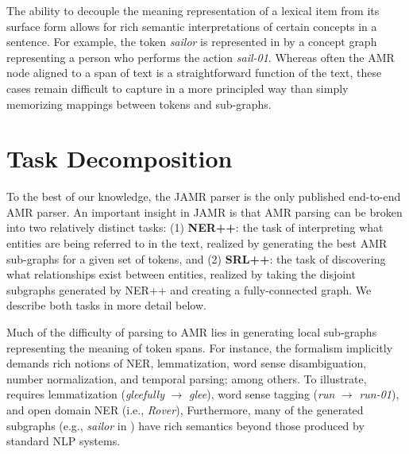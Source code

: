 \documentclass[11pt]{article}
\newcommand\w[1]{\textit{#1}} %
\newcommand\n[1]{\textit{#1}} %
\begin{document}
The ability to decouple the meaning representation of a lexical item from its
  surface form allows for rich semantic interpretations of certain concepts
  in a sentence.
For example, the token \w{sailor} is represented in  by a concept graph 
  representing a person who performs the action \n{sail-01}. 
Whereas often the AMR node aligned to a span of text is a straightforward function
  of the text, these cases remain difficult to capture in a more principled way than
  simply memorizing mappings between tokens and sub-graphs.


\section{Task Decomposition}



To the best of our knowledge, the JAMR parser is
the only published end-to-end AMR parser.
An important insight in JAMR is that AMR parsing can be broken into two 
relatively distinct tasks: (1) \textbf{NER++}: the task of interpreting what entities are being referred to in 
the text, realized by generating the best AMR sub-graphs for a given set of tokens, and
(2) \textbf{SRL++}: the task of discovering what 
relationships exist between entities, realized by taking the disjoint subgraphs generated
  by NER++ and creating a fully-connected graph.
We describe both tasks in more detail below.


Much of the difficulty of parsing to AMR lies in generating local sub-graphs representing the meaning of token spans.
For instance, the formalism implicitly demands rich notions of NER, lemmatization, word sense disambiguation, number normalization, and temporal parsing; among others.
To illustrate,  requires lemmatization (\textit{gleefully} $\rightarrow$ \textit{glee}), word sense tagging (\textit{run} $\rightarrow$ \textit{run-01}), and open domain NER (i.e., \textit{Rover}),
Furthermore, many of the generated subgraphs (e.g., \textit{sailor} in ) have rich semantics beyond those produced by standard NLP systems.
\end{document}
